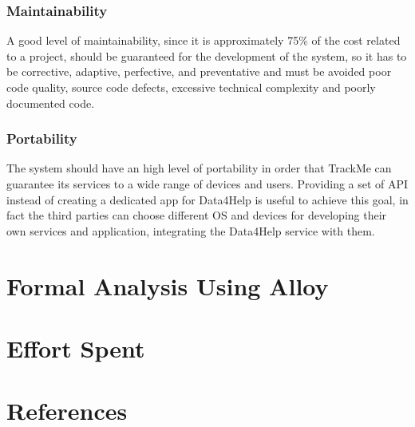 \documentclass[a4paper]{article}
\begin{document}
\vspace{0.5cm}

\subsubsection{Maintainability}

A good level of maintainability, since it is approximately 75\% of the cost related to a project, should be guaranteed for the development of the system, so it has to be corrective, adaptive, perfective, and preventative and
must be avoided poor code quality, source code defects, excessive technical complexity and poorly documented code.

\vspace{0.5cm}

\subsubsection{Portability}

The system should have an high level of portability in order that TrackMe can guarantee its services to a wide range of devices and users.
Providing a set of API instead of creating a dedicated app for Data4Help is useful to achieve this goal, in fact the third parties can choose different OS and devices for developing their own services and application, integrating the Data4Help service with them.
\clearpage

\section{Formal Analysis Using Alloy}

\section{Effort Spent}

\section{References}
\end{document}
